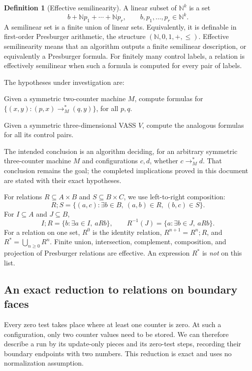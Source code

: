 \documentclass[11pt,a4paper]{article}
\theoremstyle{definition}
\newtheorem{definition}[theorem]{Definition}
\theoremstyle{remark}
\newcommand{\N}{\mathbb N}
\begin{document}
\begin{definition}[Effective semilinearity]
\label{def:presburger}
A linear subset of \(\N^k\) is a set
\[
 b+\N p_1+\cdots+\N p_r,
 \qquad b,p_1,\ldots,p_r\in\N^k.
\]
A semilinear set is a finite union of linear sets.
Equivalently, it is definable in first-order Presburger arithmetic,
the structure \((\N,0,1,+,\le)\).
Effective semilinearity means that an algorithm outputs a finite
semilinear description, or equivalently a Presburger formula.
For finitely many control labels, a relation is effectively semilinear
when such a formula is computed for every pair of labels.
\end{definition}

The hypotheses under investigation are:
\begin{description}[style=nextline,leftmargin=2.8em]
\item[\textbf{S2}] Given a symmetric two-counter machine \(M\), compute
formulas for
\(\{(x,y):(p,x)\longrightarrow_M^*(q,y)\}\), for all \(p,q\).
\item[\textbf{S3}] Given a symmetric three-dimensional VASS \(V\),
compute the analogous formulas for all its control pairs.
\end{description}
The intended conclusion is an algorithm deciding, for an arbitrary
symmetric three-counter machine \(M\) and configurations \(c,d\),
whether \(c\longrightarrow_M^*d\).
That conclusion remains the goal; the completed implications proved
in this document are stated with their exact hypotheses.

For relations \(R\subseteq A\times B\) and \(S\subseteq B\times C\),
we use left-to-right composition:
\[
 R;S=\{(a,c):\exists b\in B,\ (a,b)\in R,\ (b,c)\in S\}.
\]
For \(I\subseteq A\) and \(J\subseteq B\),
\[
 I;R=\{b:\exists a\in I,\ aRb\},\qquad
 R^{-1}(J)=\{a:\exists b\in J,\ aRb\}.
\]
For a relation on one set, \(R^0\) is the identity relation,
\(R^{n+1}=R^n;R\), and \(R^*=\bigcup_{n\ge0}R^n\).
Finite union, intersection, complement, composition, and projection
of Presburger relations are effective. An expression \(R^*\) is
\emph{not} on this list.

\subsection{An exact reduction to relations on boundary faces}

Every zero test takes place where at least one counter is zero.
At such a configuration, only two counter values need to be stored.
We can therefore describe a run by its update-only pieces and its
zero-test steps, recording their boundary endpoints with two numbers.
This reduction is exact and uses no normalization assumption.
\end{document}
